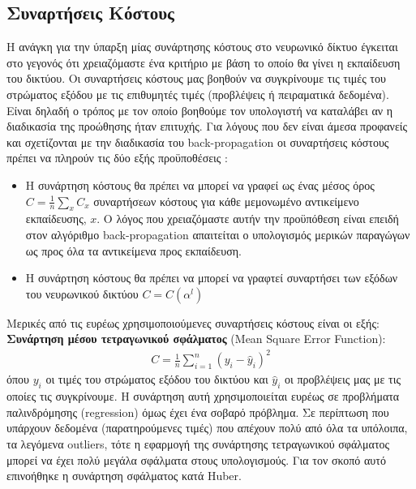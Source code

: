\documentclass[11pt]{article} %
\numberwithin{equation}{subsection}
\begin{document}
\subsection{Συναρτήσεις Κόστους}
Η ανάγκη για την ύπαρξη μίας συνάρτησης κόστους στο νευρωνικό δίκτυο έγκειται στο γεγονός ότι χρειαζόμαστε ένα κριτήριο με βάση το οποίο θα γίνει η εκπαίδευση του δικτύου. Οι συναρτήσεις κόστους μας βοηθούν να συγκρίνουμε τις τιμές του στρώματος εξόδου με τις επιθυμητές τιμές (προβλέψεις ή πειραματικά δεδομένα). Είναι δηλαδή ο τρόπος με τον οποίο βοηθούμε τον υπολογιστή να καταλάβει αν η διαδικασία της προώθησης ήταν επιτυχής. Για λόγους που δεν είναι άμεσα προφανείς και σχετίζονται με την διαδικασία του back-propagation οι συναρτήσεις κόστους πρέπει να πληρούν τις δύο εξής προϋποθέσεις \cite{neuralnets3}:\\
\begin{itemize}
\item Η συνάρτηση κόστους θα πρέπει να μπορεί να γραφεί ως ένας μέσος όρος $\displaystyle C = \frac{1}{n} \sum_{x} C_{x}$ συναρτήσεων κόστους για κάθε μεμονωμένο αντικείμενο εκπαίδευσης, $x$. Ο λόγος που χρειαζόμαστε αυτήν την προϋπόθεση είναι επειδή στον αλγόριθμο back-propagation απαιτείται ο υπολογισμός μερικών παραγώγων ως προς όλα τα αντικείμενα προς εκπαίδευση.\\
\item Η συνάρτηση κόστους θα πρέπει να μπορεί να γραφτεί συναρτήσει των εξόδων του νευρωνικού δικτύου $C = C(\alpha^{l})$
\end{itemize}


Μερικές από τις ευρέως χρησιμοποιούμενες συναρτήσεις κόστους είναι οι εξής:\\

\textbf{Συνάρτηση μέσου τετραγωνικού σφάλματος} (Mean Square Error Function):
\begin{align*}
\displaystyle C = \frac{1}{n} \sum_{i=1}^{n} (y_i - \hat{y}_i)^2
\end{align*}
όπου $y_i$ οι τιμές του στρώματος εξόδου του δικτύου και $\hat{y}_i$ οι προβλέψεις μας με τις οποίες τις συγκρίνουμε. Η συνάρτηση αυτή χρησιμοποιείται ευρέως σε προβλήματα παλινδρόμησης (regression) όμως έχει ένα σοβαρό πρόβλημα. Σε περίπτωση που υπάρχουν δεδομένα (παρατηρούμενες τιμές) που απέχουν πολύ από όλα τα υπόλοιπα, τα λεγόμενα outliers, τότε η εφαρμογή της συνάρτησης τετραγωνικού σφάλματος μπορεί να έχει πολύ μεγάλα σφάλματα στους υπολογισμούς. Για τον σκοπό αυτό επινοήθηκε η συνάρτηση σφάλματος κατά Huber. \\
\end{document}
